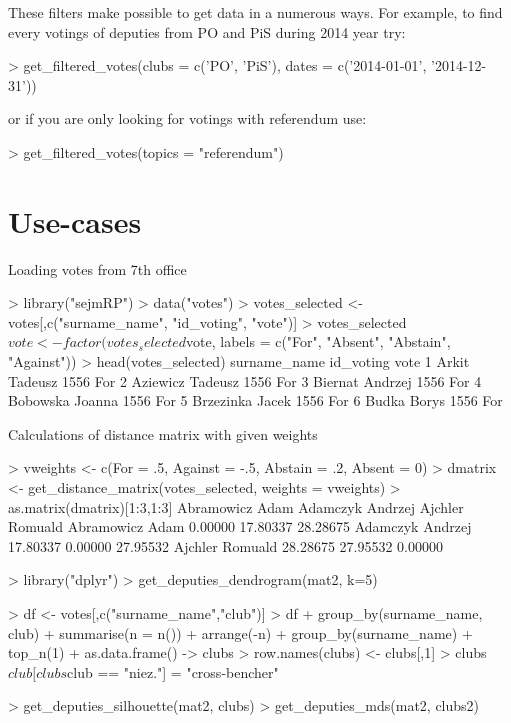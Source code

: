 These filters make possible to get data in a numerous ways. For example, to find every votings of deputies from PO and PiS during 2014 year try:

\begin{example}
> get_filtered_votes(clubs = c('PO', 'PiS'), dates = c('2014-01-01', '2014-12-31'))
\end{example}

or if you are only looking for votings with referendum use:

\begin{example}
> get_filtered_votes(topics = "referendum")
\end{example}

\section{Use-cases}


Loading votes from 7th office

\begin{example}
> library("sejmRP")
> data("votes")
> votes_selected <- votes[,c("surname_name", "id_voting", "vote")]
> votes_selected$vote <- factor(votes_selected$vote, labels = c("For", "Absent", "Abstain", "Against"))
> head(votes_selected)
        surname_name id_voting vote
1      Arkit Tadeusz      1556   For
2   Aziewicz Tadeusz      1556   For
3    Biernat Andrzej      1556   For
4    Bobowska Joanna      1556   For
5    Brzezinka Jacek      1556   For
6        Budka Borys      1556   For
\end{example}

Calculations of distance matrix with given weights

\begin{example}
> vweights <- c(For = .5, Against = -.5, Abstain = .2, Absent = 0)
> dmatrix <- get_distance_matrix(votes_selected, weights = vweights)
> as.matrix(dmatrix)[1:3,1:3]
                 Abramowicz Adam Adamczyk Andrzej Ajchler Romuald
Abramowicz Adam          0.00000         17.80337        28.28675
Adamczyk Andrzej        17.80337          0.00000        27.95532
Ajchler Romuald         28.28675         27.95532         0.00000
\end{example}


\begin{example}
> library("dplyr")
> get_deputies_dendrogram(mat2, k=5)

> df <- votes[,c("surname_name","club")]
> df %
+   group_by(surname_name, club) %
+   summarise(n = n()) %
+   arrange(-n) %
+   group_by(surname_name) %
+   top_n(1) %
+   as.data.frame() -> clubs
> row.names(clubs) <- clubs[,1]
> clubs$club[clubs$club == "niez."] = "cross-bencher"

> get_deputies_silhouette(mat2, clubs)
> get_deputies_mds(mat2, clubs2)

\end{example}


